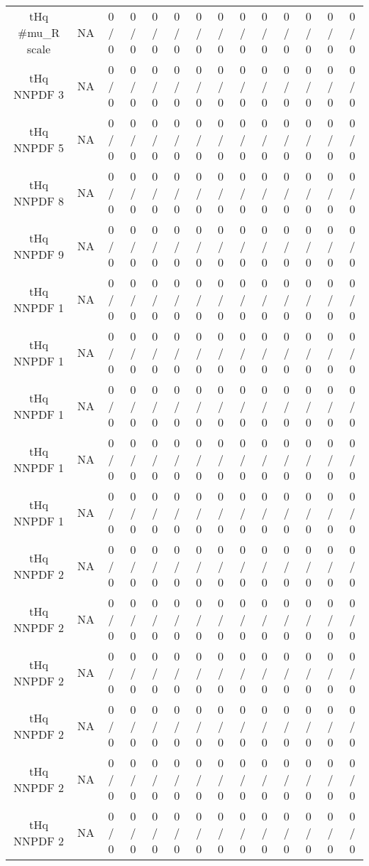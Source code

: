 \documentclass[10pt]{article}
\begin{document}
\begin{table}[htbp]
\begin{center}
\begin{tabular}{|c|c|c|c|c|c|c|c|c|c|c|c|c|c|}
  tHq #mu_{R} scale &    NA    & 0 / 0 & 0 / 0 & 0 / 0 & 0 / 0 & 0 / 0 & 0 / 0 & 0 / 0 & 0 / 0 & 0 / 0 & 0 / 0 & 0 / 0 & 0 / 0 \\ 
  tHq NNPDF 3 &    NA    & 0 / 0 & 0 / 0 & 0 / 0 & 0 / 0 & 0 / 0 & 0 / 0 & 0 / 0 & 0 / 0 & 0 / 0 & 0 / 0 & 0 / 0 & 0 / 0 \\ 
  tHq NNPDF 5 &    NA    & 0 / 0 & 0 / 0 & 0 / 0 & 0 / 0 & 0 / 0 & 0 / 0 & 0 / 0 & 0 / 0 & 0 / 0 & 0 / 0 & 0 / 0 & 0 / 0 \\ 
  tHq NNPDF 8 &    NA    & 0 / 0 & 0 / 0 & 0 / 0 & 0 / 0 & 0 / 0 & 0 / 0 & 0 / 0 & 0 / 0 & 0 / 0 & 0 / 0 & 0 / 0 & 0 / 0 \\ 
  tHq NNPDF 9 &    NA    & 0 / 0 & 0 / 0 & 0 / 0 & 0 / 0 & 0 / 0 & 0 / 0 & 0 / 0 & 0 / 0 & 0 / 0 & 0 / 0 & 0 / 0 & 0 / 0 \\ 
  tHq NNPDF 1 &    NA    & 0 / 0 & 0 / 0 & 0 / 0 & 0 / 0 & 0 / 0 & 0 / 0 & 0 / 0 & 0 / 0 & 0 / 0 & 0 / 0 & 0 / 0 & 0 / 0 \\ 
  tHq NNPDF 1 &    NA    & 0 / 0 & 0 / 0 & 0 / 0 & 0 / 0 & 0 / 0 & 0 / 0 & 0 / 0 & 0 / 0 & 0 / 0 & 0 / 0 & 0 / 0 & 0 / 0 \\ 
  tHq NNPDF 1 &    NA    & 0 / 0 & 0 / 0 & 0 / 0 & 0 / 0 & 0 / 0 & 0 / 0 & 0 / 0 & 0 / 0 & 0 / 0 & 0 / 0 & 0 / 0 & 0 / 0 \\ 
  tHq NNPDF 1 &    NA    & 0 / 0 & 0 / 0 & 0 / 0 & 0 / 0 & 0 / 0 & 0 / 0 & 0 / 0 & 0 / 0 & 0 / 0 & 0 / 0 & 0 / 0 & 0 / 0 \\ 
  tHq NNPDF 1 &    NA    & 0 / 0 & 0 / 0 & 0 / 0 & 0 / 0 & 0 / 0 & 0 / 0 & 0 / 0 & 0 / 0 & 0 / 0 & 0 / 0 & 0 / 0 & 0 / 0 \\ 
  tHq NNPDF 2 &    NA    & 0 / 0 & 0 / 0 & 0 / 0 & 0 / 0 & 0 / 0 & 0 / 0 & 0 / 0 & 0 / 0 & 0 / 0 & 0 / 0 & 0 / 0 & 0 / 0 \\ 
  tHq NNPDF 2 &    NA    & 0 / 0 & 0 / 0 & 0 / 0 & 0 / 0 & 0 / 0 & 0 / 0 & 0 / 0 & 0 / 0 & 0 / 0 & 0 / 0 & 0 / 0 & 0 / 0 \\ 
  tHq NNPDF 2 &    NA    & 0 / 0 & 0 / 0 & 0 / 0 & 0 / 0 & 0 / 0 & 0 / 0 & 0 / 0 & 0 / 0 & 0 / 0 & 0 / 0 & 0 / 0 & 0 / 0 \\ 
  tHq NNPDF 2 &    NA    & 0 / 0 & 0 / 0 & 0 / 0 & 0 / 0 & 0 / 0 & 0 / 0 & 0 / 0 & 0 / 0 & 0 / 0 & 0 / 0 & 0 / 0 & 0 / 0 \\ 
  tHq NNPDF 2 &    NA    & 0 / 0 & 0 / 0 & 0 / 0 & 0 / 0 & 0 / 0 & 0 / 0 & 0 / 0 & 0 / 0 & 0 / 0 & 0 / 0 & 0 / 0 & 0 / 0 \\ 
  tHq NNPDF 2 &    NA    & 0 / 0 & 0 / 0 & 0 / 0 & 0 / 0 & 0 / 0 & 0 / 0 & 0 / 0 & 0 / 0 & 0 / 0 & 0 / 0 & 0 / 0 & 0 / 0 \\ 

\end{tabular}
\end{center}
\end{table}
\end{document}
